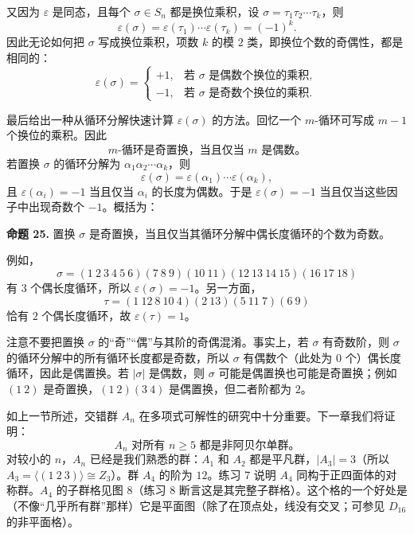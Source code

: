 又因为 $\varepsilon$ 是同态，且每个 $\sigma\in S_n$ 都是换位乘积，设 $\sigma=\tau_1\tau_2\cdots\tau_k$，则
\[
  \varepsilon(\sigma)=\varepsilon(\tau_1)\cdots\varepsilon(\tau_k)=(-1)^k.
\]
因此无论如何把 $\sigma$ 写成换位乘积，项数 $k$ 的模 $2$ 类，即换位个数的奇偶性，都是相同的：
\[
  \varepsilon(\sigma)=
  \begin{cases}
    +1,&\text{若 $\sigma$ 是偶数个换位的乘积},\\
    -1,&\text{若 $\sigma$ 是奇数个换位的乘积}.
  \end{cases}
\]

最后给出一种从循环分解快速计算 $\varepsilon(\sigma)$ 的方法。回忆一个 $m$-循环可写成 $m-1$ 个换位的乘积。因此
\[
  \text{$m$-循环是奇置换，当且仅当 $m$ 是偶数。}
\]
若置换 $\sigma$ 的循环分解为 $\alpha_1\alpha_2\cdots\alpha_k$，则
\[
  \varepsilon(\sigma)=\varepsilon(\alpha_1)\cdots\varepsilon(\alpha_k),
\]
且 $\varepsilon(\alpha_i)=-1$ 当且仅当 $\alpha_i$ 的长度为偶数。于是 $\varepsilon(\sigma)=-1$ 当且仅当这些因子中出现奇数个 $-1$。概括为：

\medskip
\noindent\textbf{命题 25.} 置换 $\sigma$ 是奇置换，当且仅当其循环分解中偶长度循环的个数为奇数。

例如，
\[
  \sigma=(1\ 2\ 3\ 4\ 5\ 6)(7\ 8\ 9)(10\ 11)(12\ 13\ 14\ 15)(16\ 17\ 18)
\]
有 $3$ 个偶长度循环，所以 $\varepsilon(\sigma)=-1$。另一方面，
\[
  \tau=(1\ 12\ 8\ 10\ 4)(2\ 13)(5\ 11\ 7)(6\ 9)
\]
恰有 $2$ 个偶长度循环，故 $\varepsilon(\tau)=1$。

注意不要把置换 $\sigma$ 的“奇”“偶”与其阶的奇偶混淆。事实上，若 $\sigma$ 有奇数阶，则 $\sigma$ 的循环分解中的所有循环长度都是奇数，所以 $\sigma$ 有偶数个（此处为 $0$ 个）偶长度循环，因此是偶置换。若 $|\sigma|$ 是偶数，则 $\sigma$ 可能是偶置换也可能是奇置换；例如 $(1\ 2)$ 是奇置换，$(1\ 2)(3\ 4)$ 是偶置换，但二者阶都为 $2$。

如上一节所述，交错群 $A_n$ 在多项式可解性的研究中十分重要。下一章我们将证明：
\[
  A_n\text{ 对所有 }n\geq5\text{ 都是非阿贝尔单群。}
\]
对较小的 $n$，$A_n$ 已经是我们熟悉的群：$A_1$ 和 $A_2$ 都是平凡群，$|A_3|=3$（所以 $A_3=\langle(1\ 2\ 3)\rangle\cong Z_3$）。群 $A_4$ 的阶为 $12$。练习 7 说明 $A_4$ 同构于正四面体的对称群。$A_4$ 的子群格见图 8（练习 8 断言这是其完整子群格）。这个格的一个好处是（不像“几乎所有群”那样）它是平面图（除了在顶点处，线没有交叉；可参见 $D_{16}$ 的非平面格）。

